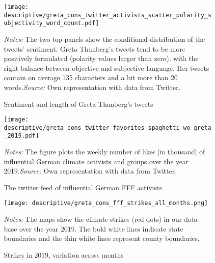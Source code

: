 \restoregeometry
\vspace*{\fill}
\begin{figure}[H]
	\centering\caption{Sentiment and length of Greta Thunberg's tweets}
	\label{fig_greta_cons:twitter_greta_sentiment_length}
	\texttt{[image: descriptive/greta\_cons\_twitter\_activists\_scatter\_polarity\_subjectivity\_word\_count.pdf]}
	\begin{minipage}{0.99\linewidth}
		\scriptsize{\emph{Notes:} The two top panels show the conditional distribution of the tweets' sentiment. Greta Thunberg's tweets tend to be more positively formulated (polarity values larger than zero), with the right balance between objective and subjective language. Her tweets contain on average 135 characters and a bit more than 20 words.\newline\emph{Source:} Own representation with data from Twitter.}
	\end{minipage}
\end{figure}
\vspace*{\fill}\clearpage
\vspace*{\fill}
\begin{figure}[H]
	\centering\caption{The twitter feed of influential German FFF activists}\label{fig_greta_cons:twitter_favorites_activists}
	\texttt{[image: descriptive/greta\_cons\_twitter\_favorites\_spaghetti\_wo\_greta\_2019.pdf]}
	\begin{minipage}{0.99\linewidth}
		\scriptsize{\emph{Notes:} The figure plots the weekly number of likes [in thousand] of influential German climate activists and groups over the year 2019.\newline\emph{Source:} Own representation with data from Twitter.}
	\end{minipage}
\end{figure}
\vspace*{\fill}\clearpage
\vspace*{\fill}
\begin{figure}[H]\centering
	\caption{Strikes in 2019, variation across months}\label{fig_greta_cons:fff_strikes_months}
	\texttt{[image: descriptive/greta\_cons\_fff\_strikes\_all\_months.png]}
	\begin{minipage}{0.99\linewidth}
		\scriptsize{\emph{Notes:} The maps show the climate strikes (red dots) in our data base over the year 2019. The bold white lines indicate state boundaries and the thin white lines represent county boundaries.}
	\end{minipage}
\end{figure}
